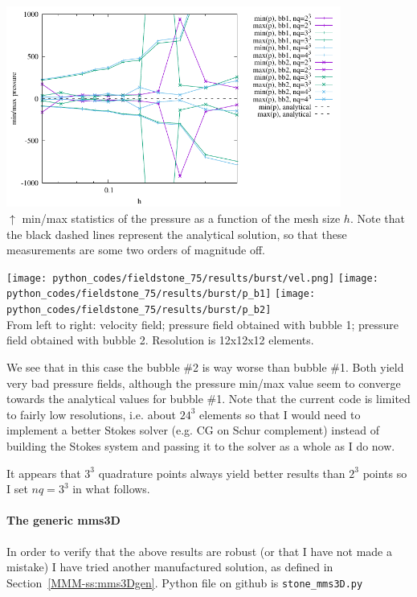 \begin{center}
\includegraphics[width=11cm]{python_codes/fieldstone_75/results/burst/p_stats.pdf}\\
{\captionfont $\uparrow$ min/max statistics of the pressure as a function of the mesh size $h$. Note that 
the black dashed lines represent the analytical solution, so that these measurements are some two 
orders of magnitude off.}
\end{center}

\begin{center}
\texttt{[image: python\_codes/fieldstone\_75/results/burst/vel.png]}
\texttt{[image: python\_codes/fieldstone\_75/results/burst/p\_b1]}
\texttt{[image: python\_codes/fieldstone\_75/results/burst/p\_b2]}\\
{\captionfont From left to right: velocity field; pressure field obtained with bubble 1;
pressure field obtained with bubble 2. Resolution is 12x12x12 elements.}
\end{center}

We see that in this case the bubble \#2 is way worse than bubble \#1. Both 
yield very bad pressure fields, although the pressure min/max value seem to converge 
towards the analytical values for bubble \#1. 
Note that the current code is limited to fairly low resolutions, i.e. about $24^3$ elements so that
I would need to implement a better Stokes solver (e.g. CG on Schur complement) instead 
of building the Stokes system and passing it to the solver as a whole as I do now. %

It appears that $3^3$ quadrature points always yield better results than $2^3$ points
so I set $nq=3^3$ in what follows.

\paragraph{The generic mms3D} In order to verify that 
the above results are robust (or that I have not made a mistake)
I have tried another manufactured solution, as defined in Section~\ref{MMM-ss:mms3Dgen}. 
Python file on github is {\tt stone\_mms3D.py}

